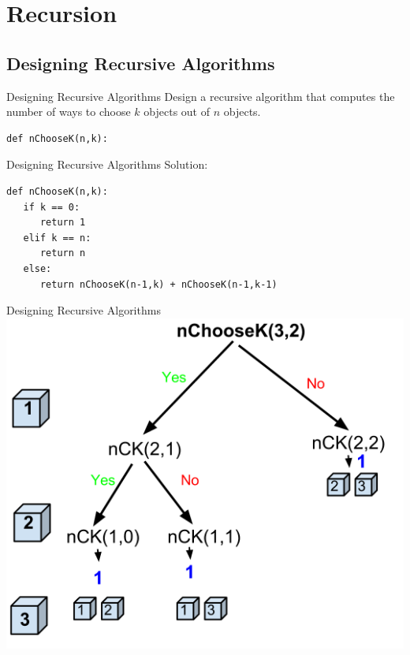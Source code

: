 \documentclass[9pt]{beamer}
\begin{document}
\section{Recursion}
\subsection{Designing Recursive Algorithms}
\begin{frame}[fragile]{Designing Recursive Algorithms}
  Design a recursive algorithm that computes the number of ways to choose
  $k$ objects out of $n$ objects.

  \begin{lstlisting}[numbers=none, frame=none, xleftmargin=0pt]
def nChooseK(n,k):
  \end{lstlisting}
\end{frame}

\begin{frame}[fragile]{Designing Recursive Algorithms}
  Solution:

  \begin{lstlisting}
def nChooseK(n,k):
   if k == 0:
      return 1
   elif k == n:
      return n
   else:
      return nChooseK(n-1,k) + nChooseK(n-1,k-1)
  \end{lstlisting}
\end{frame}

\begin{frame}[fragile]{Designing Recursive Algorithms}
  \includegraphics[scale=0.5]{nChooseK.png}
\end{frame}
\end{document}
